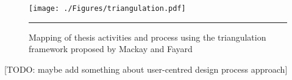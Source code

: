 \begin{figure}[htbp]
	\centering
		\texttt{[image: ./Figures/triangulation.pdf]}
		\rule{35em}{0.5pt}
	\caption[Triangulation]{Mapping of thesis activities and process using the triangulation framework proposed by Mackay and Fayard \cite{mackay_hci_1997}}
	\label{fig:triangulation}
\end{figure}

[TODO: maybe add something about user-centred design process approach]

















